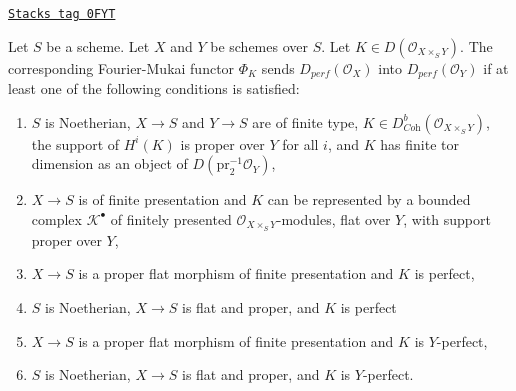 \begin{lemma}
\label{equiv-lemma-fourier-mukai}
\href{https://stacks.math.columbia.edu/tag/0FYT}{\texttt{Stacks tag 0FYT}}

Let $S$ be a scheme. Let $X$ and $Y$ be schemes over $S$.
Let $K \in D(\mathcal{O}_{X \times_S Y})$.
The corresponding Fourier-Mukai functor $\Phi_K$ sends
$D_{perf}(\mathcal{O}_X)$ into $D_{perf}(\mathcal{O}_Y)$ if at least
one of the following conditions is satisfied:
\begin{enumerate}
\item $S$ is Noetherian, $X \to S$ and $Y \to S$ are of finite type,
$K \in D^b_{\textit{Coh}}(\mathcal{O}_{X \times_S Y})$, the support of $H^i(K)$
is proper over $Y$ for all $i$, and $K$ has finite tor dimension
as an object of $D(\text{pr}_2^{-1}\mathcal{O}_Y)$,
\item $X \to S$ is of finite presentation and $K$ can be represented
by a bounded complex $\mathcal{K}^\bullet$ of finitely presented
$\mathcal{O}_{X \times_S Y}$-modules, flat over $Y$, with support
proper over $Y$,
\item $X \to S$ is a proper flat morphism of finite presentation
and $K$ is perfect,
\item $S$ is Noetherian, $X \to S$ is flat and proper, and $K$ is perfect
\item $X \to S$ is a proper flat morphism of finite presentation
and $K$ is $Y$-perfect,
\item $S$ is Noetherian, $X \to S$ is flat and proper, and $K$ is
$Y$-perfect.
\end{enumerate}
\end{lemma}

